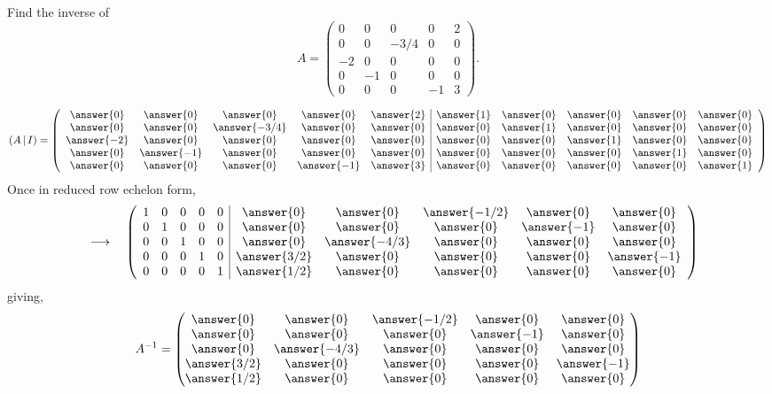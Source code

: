 \documentclass{ximera}
\author{Parisa Fatheddin}
\begin{document}
\begin{exercise}
  Find the inverse of
  \[A = \begin{pmatrix}
    0 & 0& 0& 0& 2\\
    0 & 0& -3/4& 0& 0\\
    -2 & 0& 0& 0& 0\\
    0 & -1& 0& 0& 0\\
    0 & 0& 0& -1& 3
  \end{pmatrix}.
  \]
  \begin{prompt}
\[ (A \,|\, I)=
\left(\begin{array}{ccccc|ccccc}
\answer{0} & \answer{0} & \answer{0} & \answer{0} & \answer{2} & \answer{1} & \answer{0} & \answer{0} & \answer{0}& \answer{0}\\
\answer{0} & \answer{0} & \answer{-3/4} & \answer{0} & \answer{0} & \answer{0} & \answer{1} & \answer{0} & \answer{0} & \answer{0}\\
\answer{-2} & \answer{0} & \answer{0} & \answer{0} & \answer{0} & \answer{0} & \answer{0} & \answer{1} & \answer{0} & \answer{0}\\
\answer{0} & \answer{-1} & \answer{0} & \answer{0} & \answer{0}& \answer{0} & \answer{0} & \answer{0} & \answer{1} & \answer{0}\\
\answer{0} & \answer{0} & \answer{0} & \answer{-1} & \answer{3}& \answer{0} & \answer{0} & \answer{0} & \answer{0} & \answer{1}
\end{array}\right)
\]
Once in reduced row echelon form,
\[
\quad\longrightarrow \quad
\left(\begin{array}{ccccc|ccccc}
1 & 0& 0& 0& 0 & \answer{0} & \answer{0} & \answer{-1/2} & \answer{0} & \answer{0}\\
0 & 1& 0& 0& 0 & \answer{0} & \answer{0} & \answer{0} & \answer{-1} & \answer{0}\\
0 & 0& 1& 0& 0 & \answer{0} & \answer{-4/3} & \answer{0} & \answer{0} & \answer{0}\\
0 & 0& 0& 1& 0 & \answer{3/2} & \answer{0} & \answer{0} & \answer{0} & \answer{-1}\\
0 & 0& 0& 0& 1 & \answer{1/2} & \answer{0} & \answer{0} & \answer{0} & \answer{0}
\end{array}\right)
\]
giving,
\[
A^{-1} = \begin{pmatrix}
\answer{0} & \answer{0} & \answer{-1/2} & \answer{0} & \answer{0}\\
 \answer{0} & \answer{0} & \answer{0} & \answer{-1} & \answer{0}\\
 \answer{0} & \answer{-4/3} & \answer{0} & \answer{0} & \answer{0}\\
 \answer{3/2} & \answer{0} & \answer{0} & \answer{0} & \answer{-1}\\
 \answer{1/2} & \answer{0} & \answer{0} & \answer{0} & \answer{0}
\end{pmatrix}
\]
  \end{prompt}
\end{exercise}
\end{document}
